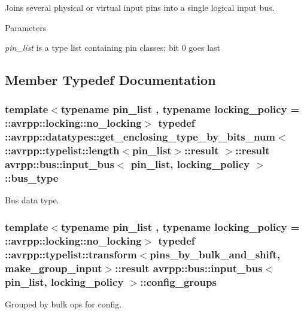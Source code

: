 Joins several physical or virtual input pins into a single logical input bus. 
\begin{DoxyParams}{Parameters}
\item[{\em pin\_\-list}]is a type list containing pin classes; bit 0 goes last \end{DoxyParams}


\subsection{Member Typedef Documentation}
\hypertarget{structavrpp_1_1bus_1_1input__bus_aa1146b9861eb713a67224e329e4244a9}{
\subsubsection[{bus\_\-type}]{\setlength{\rightskip}{0pt plus 5cm}template$<$typename pin\_\-list , typename locking\_\-policy  = ::avrpp::locking::no\_\-locking$>$ typedef ::{\bf avrpp::datatypes::get\_\-enclosing\_\-type\_\-by\_\-bits\_\-num}$<$ ::{\bf avrpp::typelist::length}$<$pin\_\-list$>$::result $>$::result {\bf avrpp::bus::input\_\-bus}$<$ pin\_\-list, locking\_\-policy $>$::{\bf bus\_\-type}}}
\label{structavrpp_1_1bus_1_1input__bus_aa1146b9861eb713a67224e329e4244a9}


Bus data type. 

\hypertarget{structavrpp_1_1bus_1_1input__bus_a8187a3f01eb0585590a71c07806d6f2d}{
\subsubsection[{config\_\-groups}]{\setlength{\rightskip}{0pt plus 5cm}template$<$typename pin\_\-list , typename locking\_\-policy  = ::avrpp::locking::no\_\-locking$>$ typedef ::avrpp::typelist::transform$<${\bf pins\_\-by\_\-bulk\_\-and\_\-shift}, {\bf make\_\-group\_\-input}$>$::result {\bf avrpp::bus::input\_\-bus}$<$ pin\_\-list, locking\_\-policy $>$::{\bf config\_\-groups}}}
\label{structavrpp_1_1bus_1_1input__bus_a8187a3f01eb0585590a71c07806d6f2d}


Grouped by bulk ops for config. 


